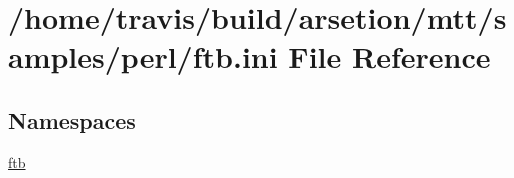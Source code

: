 \hypertarget{ftb_8ini}{\section{/home/travis/build/arsetion/mtt/samples/perl/ftb.ini File Reference}
\label{ftb_8ini}
}
\subsection*{Namespaces}
\begin{DoxyCompactItemize}
\item 
\hyperlink{namespaceftb}{ftb}
\end{DoxyCompactItemize}
